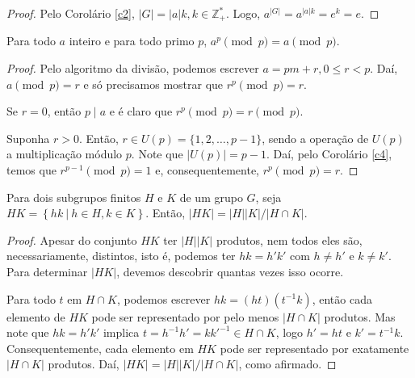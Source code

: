 	\begin{proof}
		Pelo Corolário \ref{c2}, $|G| = |a| k, k\in\mathbb{Z}_{+}^{*}$.
		Logo, $a^{|G|} = a^{|a|k} = e^k = e$. 
	\end{proof}
	\begin{corollary}
	\label{c5}
		Para todo $a$ inteiro e para todo primo $p$, $a^p \pmod p = a\pmod p$.
	\end{corollary}
	\begin{proof}
		Pelo algoritmo da divisão, podemos escrever $a = pm + r, 0\leq r < p$.
		Daí, $a\pmod p = r$ e só precisamos mostrar que $r^p\pmod p = r$.
		\par\vspace{0.3cm} Se $r = 0$, então $p\mid a$ e é claro que 
		$r^p\pmod p = r\pmod p$.
		\par\vspace{0.3cm} Suponha $r>0$. Então, 
		$r\in U(p) = \{1, 2, \dots, p-1\}$, sendo a operação de $U(p)$ a
		multiplicação módulo $p$. Note que $|U(p)| = p-1$. Daí, pelo
		Corolário \ref{c4}, temos que $r^{p-1}\pmod p = 1$ e,
		consequentemente, $r^p\pmod p = r$. 
	\end{proof}
	\begin{theorem}
	\label{ordem de HK}
		Para dois subgrupos finitos $H$ e $K$ de um grupo $G$, seja 
		$HK = \left\{ hk \ | \ h\in H, k\in K \right\}$. Então, 
		$|HK| = |H||K|/|H\cap K|$.
	\end{theorem}
	\begin{proof}
		Apesar do conjunto $HK$ ter $|H||K|$ produtos, nem todos eles são,
		necessariamente, distintos, isto é, podemos ter $hk = h'k'$ com 
		$h\neq h'$ e $k\neq k'$. Para determinar $|HK|$, devemos descobrir
		quantas vezes isso ocorre.
		\par\vspace{0.3cm} Para todo $t$ em $H\cap K$, podemos escrever 
		$hk = (ht)(t^{-1}k)$, então cada elemento de $HK$ pode ser
		representado por pelo menos $|H\cap K|$ produtos. Mas note que 
		$hk = h'k'$ implica $t = h^{-1}h' = kk'^{-1}\in H\cap K$, logo 
		$h' = ht$ e $k' = t^{-1}k$. Consequentemente, cada elemento em $HK$
		pode ser representado por exatamente $|H\cap K|$ produtos. Daí, 
		$|HK| = |H||K|/|H\cap K|$, como afirmado.
	\end{proof}
